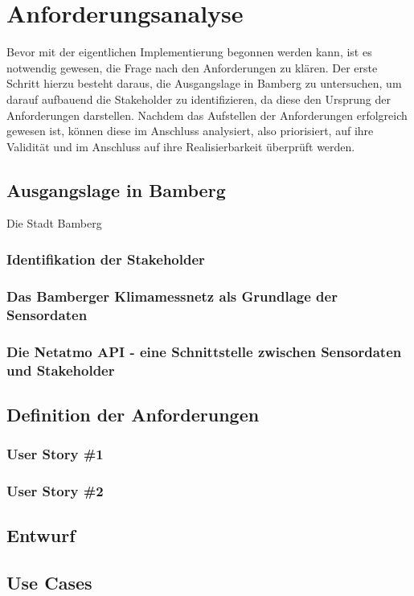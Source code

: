 \chapter{Anforderungsanalyse} %
Bevor mit der eigentlichen Implementierung begonnen werden kann, ist es notwendig gewesen, die Frage nach den Anforderungen zu klären. Der erste Schritt 
hierzu besteht daraus, die Ausgangslage in Bamberg zu untersuchen, um darauf aufbauend die Stakeholder zu identifizieren, da diese den Ursprung der Anforderungen 
darstellen. Nachdem das Aufstellen der Anforderungen erfolgreich gewesen ist, können diese im Anschluss analysiert, also priorisiert, auf ihre Validität und im Anschluss 
auf ihre Realisierbarkeit überprüft werden.

\section{Ausgangslage in Bamberg}
Die Stadt Bamberg

\subsection{Identifikation der Stakeholder}

\subsection{Das Bamberger Klimamessnetz als Grundlage der Sensordaten}

\subsection{Die Netatmo API - eine Schnittstelle zwischen Sensordaten und Stakeholder}

\section{Definition der Anforderungen}

\subsection{User Story \#1}

\subsection{User Story \#2}

\section{Entwurf}

\section{Use Cases}